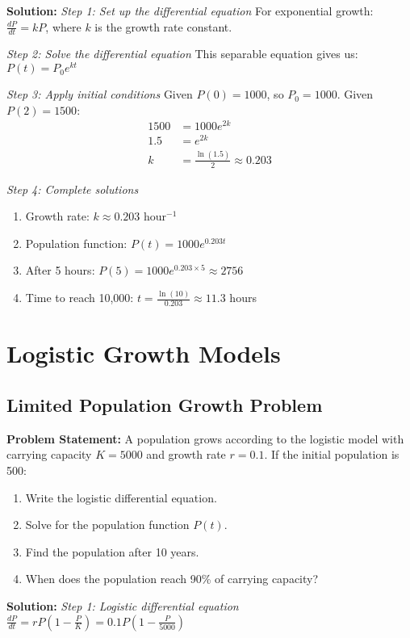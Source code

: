 \documentclass[12pt, letterpaper]{book}
\begin{document}
\textbf{Solution:}
\textit{Step 1: Set up the differential equation}
For exponential growth: $\frac{dP}{dt} = kP$, where $k$ is the growth rate constant.

\textit{Step 2: Solve the differential equation}
This separable equation gives us: $P(t) = P_0 e^{kt}$

\textit{Step 3: Apply initial conditions}
Given $P(0) = 1000$, so $P_0 = 1000$.
Given $P(2) = 1500$:
\begin{align*}
1500 &= 1000e^{2k} \\
1.5 &= e^{2k} \\
k &= \frac{\ln(1.5)}{2} \approx 0.203
\end{align*}

\textit{Step 4: Complete solutions}
\begin{enumerate}
    \item Growth rate: $k \approx 0.203$ hour$^{-1}$
    \item Population function: $P(t) = 1000e^{0.203t}$
    \item After 5 hours: $P(5) = 1000e^{0.203 \times 5} \approx 2756$
    \item Time to reach 10,000: $t = \frac{\ln(10)}{0.203} \approx 11.3$ hours
\end{enumerate}

\section{Logistic Growth Models}

\subsection{Limited Population Growth Problem}
\textbf{Problem Statement:}
A population grows according to the logistic model with carrying capacity $K = 5000$ and growth rate $r = 0.1$. If the initial population is 500:
\begin{enumerate}
    \item Write the logistic differential equation.
    \item Solve for the population function $P(t)$.
    \item Find the population after 10 years.
    \item When does the population reach 90\% of carrying capacity?
\end{enumerate}

\textbf{Solution:}
\textit{Step 1: Logistic differential equation}
$\frac{dP}{dt} = rP\left(1-\frac{P}{K}\right) = 0.1P\left(1-\frac{P}{5000}\right)$
\end{document}
